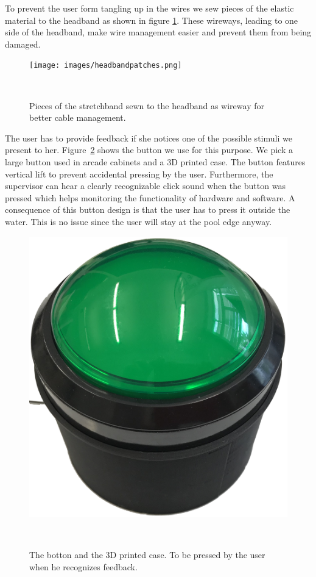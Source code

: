 To prevent the user form tangling up in the wires we sew pieces of the elastic material to the headband as shown in figure \ref{fig:headbandpatches}.
These wireways, leading to one side of the headband, make wire management easier and prevent them from being damaged.

\begin{figure}
	\texttt{[image: images/headbandpatches.png]}
	\caption{Pieces of the stretchband sewn to the headband as wireway for better cable management.}~\label{fig:headbandpatches}
\end{figure}

The user has to provide feedback if she notices one of the possible stimuli we present to her.
Figure~\ref{fig:button} shows the button we use for this purpose.
We pick a large button used in arcade cabinets and a 3D printed case. 
The button features vertical lift to prevent accidental pressing by the user. 
Furthermore, the supervisor can hear a clearly recognizable click sound when the button was pressed which helps monitoring the functionality of hardware and software.
A consequence of this button design is that the user has to press it outside the water.
This is no issue since the user will stay at the pool edge anyway.

\begin{figure}
	\includegraphics[width= \textwidth]{images/button.png}
	\caption{The botton and the 3D printed case. To be pressed by the user when he recognizes feedback.}~\label{fig:button}
\end{figure}

